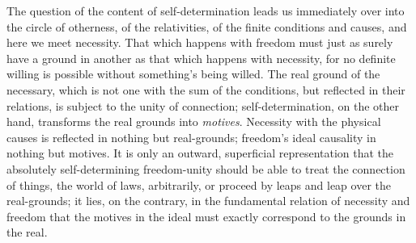 \documentclass[12pt]{article}
\begin{document}
The question of the content of self-determination leads us immediately over
into the circle of otherness, of the relativities, of the finite conditions
and causes, and here we meet necessity. That which happens with freedom must
just as surely have a ground in another as that which happens with necessity,
for no definite willing is possible without something's being willed. The
real ground of the necessary, which is not one with the sum of the
conditions, but reflected in their relations, is subject to the unity of
connection; self-determination, on the other hand, transforms the real
grounds into \emph{motives}. Necessity with the physical causes is reflected
in nothing but real-grounds; freedom's ideal causality in nothing but
motives. It is only an outward, superficial representation that the
absolutely self-determining freedom-unity should be able to treat the
connection of things, the world of laws, arbitrarily, or proceed by leaps and
leap over the real-grounds; it lies, on the contrary, in the fundamental
relation of necessity and freedom that the motives in the ideal must exactly
correspond to the grounds in the real.
\end{document}
